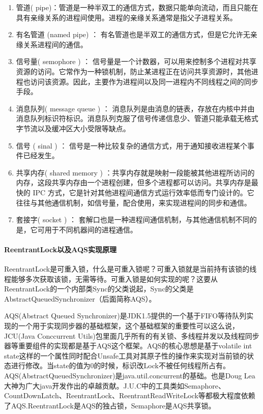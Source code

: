 \documentclass[../../../interview-questions.tex]{subfiles}
\begin{document}
\begin{enumerate}
\item {管道( pipe)：管道是一种半双工的通信方式，数据只能单向流动，而且只能在具有亲缘关系的进程间使用。进程的亲缘关系通常是指父子进程关系。}
\item{有名管道 (named pipe) ： 有名管道也是半双工的通信方式，但是它允许无亲缘关系进程间的通信。}
\item{信号量( semophore ) ： 信号量是一个计数器，可以用来控制多个进程对共享资源的访问。它常作为一种锁机制，防止某进程正在访问共享资源时，其他进程也访问该资源。因此，主要作为进程间以及同一进程内不同线程之间的同步手段。}
\item{消息队列( message queue ) ： 消息队列是由消息的链表，存放在内核中并由消息队列标识符标识。消息队列克服了信号传递信息少、管道只能承载无格式字节流以及缓冲区大小受限等缺点。}
\item{信号 ( sinal ) ： 信号是一种比较复杂的通信方式，用于通知接收进程某个事件已经发生。}
\item{共享内存( shared memory ) ：共享内存就是映射一段能被其他进程所访问的内存，这段共享内存由一个进程创建，但多个进程都可以访问。共享内存是最快的 IPC 方式，它是针对其他进程间通信方式运行效率低而专门设计的。它往往与其他通信机制，如信号量，配合使用，来实现进程间的同步和通信。}
\item{套接字( socket ) ： 套解口也是一种进程间通信机制，与其他通信机制不同的是，它可用于不同机器间的进程通信。}
\end{enumerate}


\paragraph{ReentrantLock以及AQS实现原理}

ReentrantLock是可重入锁，什么是可重入锁呢？可重入锁就是当前持有该锁的线程能够多次获取该锁，无需等待。可重入锁是如何实现的呢？这要从ReentrantLock的一个内部类Sync的父类说起，Sync的父类是AbstractQueuedSynchronizer（后面简称AQS）。

AQS(Abstract Queued Synchronizer)是JDK1.5提供的一个基于FIFO等待队列实现的一个用于实现同步器的基础框架，这个基础框架的重要性可以这么说，JCU(Java Conccurrent Utils)包里面几乎所有的有关锁、多线程并发以及线程同步器等重要组件的实现都是基于AQS这个框架。AQS的核心思想是基于volatile int state这样的一个属性同时配合Unsafe工具对其原子性的操作来实现对当前锁的状态进行修改。当state的值为0的时候，标识改Lock不被任何线程所占有。AQS(AbstractQueuedSynchronizer)是java.util.concurrent的基础。也是Doug Lea大神为广大java开发作出的卓越贡献。J.U.C中的工具类如Semaphore、CountDownLatch、ReentrantLock、ReentrantReadWriteLock等都极大程度依赖了AQS.ReentrantLock是AQS的独占锁，Semaphore是AQS共享锁。
\end{document}
